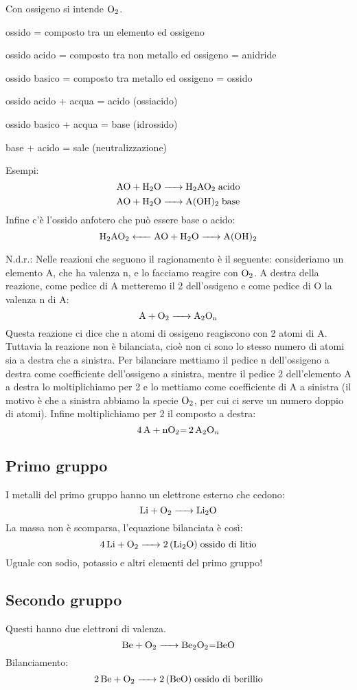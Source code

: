Con ossigeno si intende \(\ce{ O2 }\).

ossido = composto tra un elemento ed ossigeno

ossido acido = composto tra non metallo ed ossigeno = anidride

ossido basico = composto tra metallo ed ossigeno = ossido

ossido acido + acqua = acido (ossiacido)

ossido basico + acqua = base (idrossido)

base + acido = sale (neutralizzazione)

Esempi:
$$\ce{ AO + H2O -> H2AO2 } \; \text{acido}$$ 
$$\ce{ AO + H2O -> A(OH)_2 } \;  \text{base}$$
Infine c'è l'ossido anfotero che può essere base o acido:
$$\ce{ H_2AO_2 <- AO + H_2O -> A(OH)_2 }$$%

N.d.r.: Nelle reazioni che seguono il ragionamento è il seguente: consideriamo un elemento A, che ha valenza n, e lo facciamo reagire con $\rm O_2$. A destra della reazione, come pedice di A metteremo il 2 dell'ossigeno e come pedice di O la valenza n di A:
$$\ce{A + O_2 -> A_2O_{\text{n}}}$$
Questa reazione ci dice che n atomi di ossigeno reagiscono con 2 atomi di A. Tuttavia la reazione non è bilanciata, cioè non ci sono lo stesso numero di atomi sia a destra che a sinistra. Per bilanciare mettiamo il pedice n dell'ossigeno a destra come coefficiente dell'ossigeno a sinistra, mentre il pedice 2 dell'elemento A a destra lo moltiplichiamo per 2 e lo mettiamo come coefficiente di A a sinistra (il motivo è che a sinistra abbiamo la specie $\rm O_2$, per cui ci serve un numero doppio di atomi). Infine moltiplichiamo per 2 il composto a destra:
$$\ce{4A + nO_2= 2A_2O_n}$$

\subsection{Primo gruppo}
I metalli del primo gruppo hanno un elettrone esterno che cedono:
$$\ce{ Li + O_2 -> Li_2O }$$
La massa non è scomparsa, l'equazione bilanciata è così:
$$\ce{ 4 Li + O_2 -> 2 (Li_2O) } \; \text{ossido di litio}$$
Uguale con sodio, potassio e altri elementi del primo gruppo!
\subsection{Secondo gruppo}
Questi hanno due elettroni di valenza.
$$\ce{ Be + O_2 -> Be_2O_2=BeO }$$
Bilanciamento:
$$\ce{ 2 Be + O_2 -> 2 (BeO) } \; \text{ossido di berillio}$$
